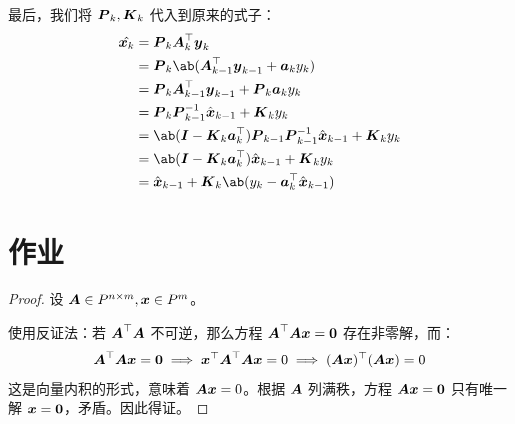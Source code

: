 最后，我们将 $\boldsymbol{P}_k, \boldsymbol{K}_k$ 代入到原来的式子：
$$
\begin{aligned}
    \hat{\vect{x}_k} & = \matr{P}_k \matr{A}_k^\top \vect{y}_k \\
    & = \matr{P}_k \ab(\matr{A}_{k - 1}^\top \vect{y}_{k - 1} + \vect{a}_k y_k) \\
    & = \matr{P}_k \matr{A}_{k - 1}^\top \vect{y}_{k - 1} + \matr{P}_k \vect{a}_k y_k \\
    & = \matr{P}_k \matr{P}_{k - 1}^{-1} \hat{\vect{x}}_{k - 1} + \matr{K}_k y_k \\
    & = \ab(\matr{I} - \matr{K}_k \vect{a}_k^\top) \matr{P}_{k - 1} \matr{P}_{k - 1}^{-1} \hat{\vect{x}}_{k - 1} + \matr{K}_k y_k \\
    & = \ab(\matr{I} - \matr{K}_k \vect{a}_k^\top) \hat{\vect{x}}_{k - 1} + \matr{K}_k y_k \\
    & = \hat{\vect{x}}_{k - 1} + \matr{K}_k \ab(y_k - \vect{a}_k^\top \hat{\vect{x}}_{k - 1})
\end{aligned}
$$

\section{作业}

\begin{problem}
    \begin{proof}
        设 $\boldsymbol{A} \in P^{n \times m}, \boldsymbol{x} \in P^{m}$。

        使用反证法：若 $\boldsymbol{A}^\top \boldsymbol{A}$ 不可逆，那么方程 $\boldsymbol{A}^\top \boldsymbol{A} \boldsymbol{x} = \boldsymbol{0}$ 存在非零解，而：
        $$
        \boldsymbol{A}^\top \boldsymbol{A} \boldsymbol{x} = \boldsymbol{0} \implies \boldsymbol{x}^\top \boldsymbol{A}^\top \boldsymbol{A} \boldsymbol{x} = 0 \implies (\boldsymbol{A} \boldsymbol{x})^\top (\boldsymbol{A} \boldsymbol{x}) = 0
        $$
        这是向量内积的形式，意味着 $\boldsymbol{A} \boldsymbol{x} = 0$。根据 $\boldsymbol{A}$ 列满秩，方程 $\boldsymbol{A} \boldsymbol{x} = \boldsymbol{0}$ 只有唯一解 $\boldsymbol{x} = \boldsymbol{0}$，矛盾。因此得证。
    \end{proof}
\end{problem}

